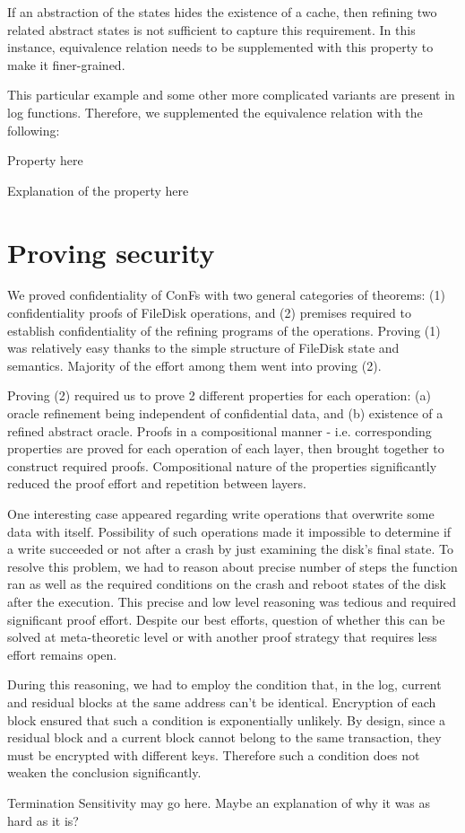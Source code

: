 If an abstraction of the states hides the existence of a cache, then refining two related abstract states is not sufficient to capture this requirement. In this instance, equivalence relation needs to be supplemented with this property to make it finer-grained.

This particular example and some other more complicated variants are present in log functions. Therefore, we supplemented the equivalence relation with the following:

{\color{red} Property here}

{\color{red} Explanation of the property here}


\section{Proving security}
We proved confidentiality of ConFs with two general categories of theorems: (1) confidentiality proofs of FileDisk operations, and (2) premises required to establish confidentiality of the refining programs of the operations. Proving (1) was relatively easy thanks to the simple structure of FileDisk state and semantics. Majority of the effort among them went into proving (2).

Proving (2) required us to prove 2 different properties for each operation: (a) oracle refinement being independent of confidential data, and (b) existence of a refined abstract oracle. Proofs in a compositional manner - i.e. corresponding properties are proved for each operation of each layer, then brought together to construct required proofs. Compositional nature of the properties significantly reduced the proof effort and repetition between layers.

One interesting case appeared regarding write operations that overwrite some data with itself. Possibility of such operations made it impossible to determine if a write succeeded or not after a crash by just examining the disk's final state. To resolve this problem, we had to reason about precise number of steps the function ran as well as the required conditions on the crash and reboot states of the disk after the execution.  This precise and low level reasoning was tedious and required significant proof effort. Despite our best efforts, question of whether this can be solved at meta-theoretic level or with another proof strategy that requires less effort remains open.

During this reasoning, we had to employ the condition that, in the log, current and residual blocks at the same address can't be identical. Encryption of each block ensured that such a condition is exponentially unlikely. By design, since a residual block and a current block cannot belong to the same transaction, they must be encrypted with different keys. Therefore such a condition does not weaken the conclusion significantly.


{\color{red} Termination Sensitivity may go here. Maybe an explanation of why it was as hard as it is?}

